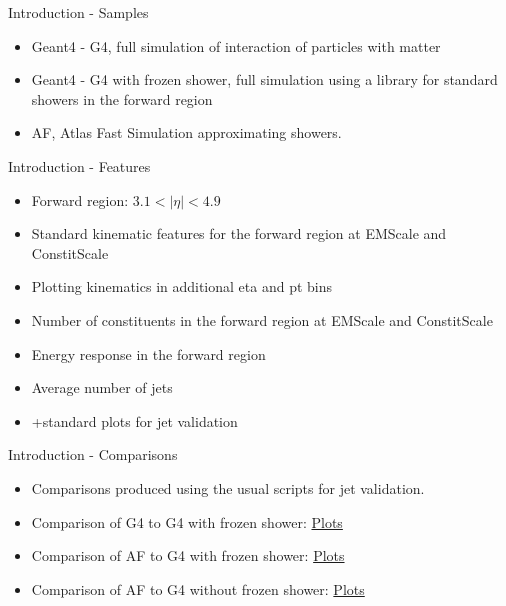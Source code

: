 \begin{frame}{Introduction - Samples}
    \begin{itemize}
        \item Geant4 - G4, full simulation of interaction of particles with matter
        \item Geant4 - G4 with frozen shower, full simulation using a library for standard showers in the forward region
        \item AF, Atlas Fast Simulation approximating showers.
    \end{itemize}
\end{frame}

\begin{frame}{Introduction - Features}
    \begin{itemize}
        \item Forward region: $3.1 < |\eta| < 4.9$
        \item Standard kinematic features for the forward region at EMScale and ConstitScale
        \item Plotting kinematics in additional eta and pt bins
        \item Number of constituents in the forward region at EMScale and ConstitScale
        \item Energy response in the forward region
        \item Average number of jets
        \item +standard plots for jet validation
    \end{itemize}
\end{frame}

\begin{frame}{Introduction - Comparisons}
    \begin{itemize}
        \item Comparisons produced using the usual scripts for jet validation.
        \item Comparison of G4 to G4 with frozen shower:   \href{https://atlas-computing.web.cern.ch/atlas-computing/links/PhysValDir/JetEtMiss/jet_2-11-21_FCal3_3/}{Plots}
        \item Comparison of AF to G4 with frozen shower:   \href{https://atlas-computing.web.cern.ch/atlas-computing/links/PhysValDir/JetEtMiss/jet_2-11-21_FCal3_2/}{Plots}
        \item Comparison of AF to G4 without frozen shower:  \href{https://atlas-computing.web.cern.ch/atlas-computing/links/PhysValDir/JetEtMiss/jet_2-11-21_FCal3/}{Plots}
    \end{itemize}
\end{frame}
